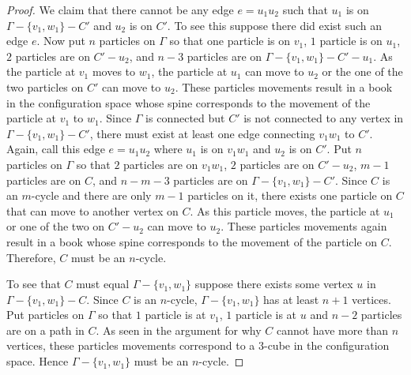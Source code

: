 \begin{proof}
We claim that there cannot be any edge \(e = u_1 u_2\) such that \(u_1\) is on \(\Gamma - \{v_1, w_1\} - C'\) and \(u_2\) is on \(C'\).
To see this suppose there did exist such an edge \(e\).
Now put \(n\) particles on \(\Gamma\) so that one particle is on \(v_1\), \(1\) particle is on \(u_1\), \(2\) particles are on \(C' - u_2\), 
and \(n - 3\) particles are on \(\Gamma - \{v_1, w_1\} - C' - u_1\).
As the particle at \(v_1\) moves to \(w_1\), the particle at \(u_1\) can move to \(u_2\) or the one of the two particles on \(C'\) can move to \(u_2\).
These particles movements result in a book in the configuration space whose spine corresponds to the movement of the particle at \(v_1\) to \(w_1\).
Since \(\Gamma\) is connected but \(C'\) is not connected to any vertex in \(\Gamma - \{v_1, w_1\} - C'\),
there must exist at least one edge connecting \(v_1 w_1\) to \(C'\).
Again, call this edge \(e = u_1 u_2\) where \(u_1\) is on \(v_1 w_1\) and \(u_2\) is on \(C'\).
Put \(n\) particles on \(\Gamma\) so that \(2\) particles are on \(v_1 w_1\), \(2\) particles are on \(C' - u_2\), \(m - 1\) particles are on \(C\),
and \(n - m - 3\) particles are on \(\Gamma - \{v_1, w_1\} - C'\).
Since \(C\) is an \(m\)-cycle and there are only \(m - 1\) particles on it, there exists one particle on \(C\) that can move to another vertex on \(C\).
As this particle moves, the particle at \(u_1\) or one of the two on \(C' - u_2\) can move to \(u_2\).
These particles movements again result in a book whose spine corresponds to the movement of the particle on \(C\).
Therefore, \(C\) must be an \(n\)-cycle.

To see that \(C\) must equal \(\Gamma - \{v_1, w_1\}\) suppose there exists some vertex \(u\) in \(\Gamma - \{v_1, w_1\} - C\).
Since \(C\) is an \(n\)-cycle, \(\Gamma - \{v_1, w_1\}\) has at least \(n + 1\) vertices.
Put particles on \(\Gamma\) so that \(1\) particle is at \(v_1\), \(1\) particle is at \(u\) and \(n-2\) particles are on a path in \(C\).
As seen in the argument for why \(C\) cannot have more than \(n\) vertices, these particles movements correspond to a \(3\)-cube in the configuration
space. Hence \(\Gamma - \{v_1, w_1\}\) must be an \(n\)-cycle.
\end{proof}

